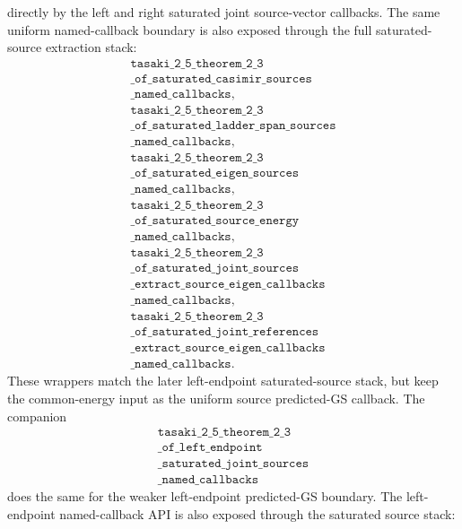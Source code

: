 \documentclass[a4paper,11pt]{article}
\begin{document}
directly by the left and right saturated joint source-vector callbacks.
The same uniform named-callback boundary is also exposed through the full
saturated-source extraction stack:
\[
\begin{gathered}
\texttt{tasaki\_2\_5\_theorem\_2\_3}\\
\texttt{\_of\_saturated\_casimir\_sources}\\
\texttt{\_named\_callbacks},\\
\texttt{tasaki\_2\_5\_theorem\_2\_3}\\
\texttt{\_of\_saturated\_ladder\_span\_sources}\\
\texttt{\_named\_callbacks},\\
\texttt{tasaki\_2\_5\_theorem\_2\_3}\\
\texttt{\_of\_saturated\_eigen\_sources}\\
\texttt{\_named\_callbacks},\\
\texttt{tasaki\_2\_5\_theorem\_2\_3}\\
\texttt{\_of\_saturated\_source\_energy}\\
\texttt{\_named\_callbacks},\\
\texttt{tasaki\_2\_5\_theorem\_2\_3}\\
\texttt{\_of\_saturated\_joint\_sources}\\
\texttt{\_extract\_source\_eigen\_callbacks}\\
\texttt{\_named\_callbacks},\\
\texttt{tasaki\_2\_5\_theorem\_2\_3}\\
\texttt{\_of\_saturated\_joint\_references}\\
\texttt{\_extract\_source\_eigen\_callbacks}\\
\texttt{\_named\_callbacks}.
\end{gathered}
\]
These wrappers match the later left-endpoint saturated-source stack, but keep
the common-energy input as the uniform source predicted-GS callback.
The companion
\[
\begin{gathered}
\texttt{tasaki\_2\_5\_theorem\_2\_3}\\
\texttt{\_of\_left\_endpoint}\\
\texttt{\_saturated\_joint\_sources}\\
\texttt{\_named\_callbacks}
\end{gathered}
\]
does the same for the weaker left-endpoint predicted-GS boundary.
The left-endpoint named-callback API is also exposed through the saturated
source stack:
\end{document}
